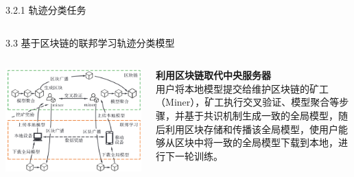 \documentclass{sintefbeamer}
\begin{document}
\begin{frame}{3.2.1 轨迹分类任务}
\begin{columns}
\begin{column}{0.6\textwidth}
\end{column}
\end{columns}
\end{frame}

\begin{frame}{3.3 基于区块链的联邦学习轨迹分类模型}
\begin{columns}
\begin{column}{0.6\textwidth}
\includegraphics[width=1\textwidth]{images/blockchain}
\end{column}
\begin{column}{0.4\textwidth}
\textbf{利用区块链取代中央服务器}\\
用户将本地模型提交给维护区块链的矿工（Miner），矿工执行交叉验证、模型聚合等步骤，并基于共识机制生成一致的全局模型，随后利用区块存储和传播该全局模型，使用户能够从区块中将一致的全局模型下载到本地，进行下一轮训练。
\end{column}
\end{columns}
\end{frame}
\end{document}
